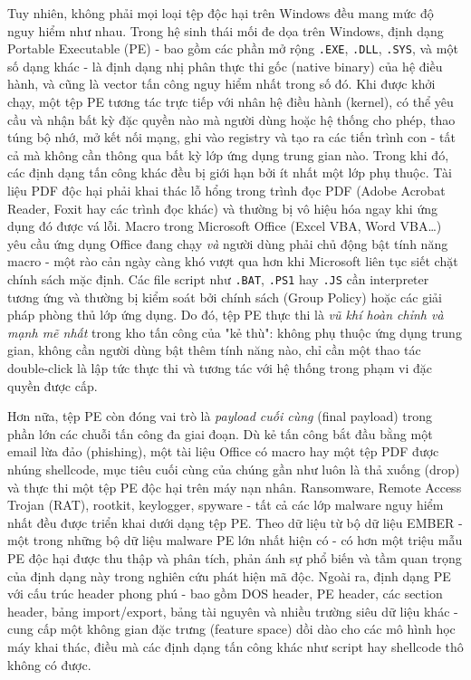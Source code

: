 Tuy nhiên, không phải mọi loại tệp độc hại trên Windows đều mang mức độ
nguy hiểm như nhau. Trong hệ sinh thái mối đe dọa trên Windows, định dạng
Portable Executable (PE) - bao gồm các phần mở rộng \texttt{.EXE},
\texttt{.DLL}, \texttt{.SYS}, và một số dạng khác - là định
dạng nhị phân thực thi gốc (native binary) của hệ điều hành, và cũng là
vector tấn công nguy hiểm nhất trong số đó. Khi được khởi chạy, một tệp PE
tương tác trực tiếp với nhân hệ điều hành (kernel), có thể yêu cầu và nhận
bất kỳ đặc quyền nào mà người dùng hoặc hệ thống cho phép, thao túng bộ nhớ,
mở kết nối mạng, ghi vào registry và tạo ra các tiến trình con - tất cả mà
không cần thông qua bất kỳ lớp ứng dụng trung gian nào. Trong khi đó, các
định dạng tấn công khác đều bị giới hạn bởi ít nhất một lớp
phụ thuộc. Tài liệu PDF độc hại phải khai thác lỗ hổng trong trình đọc PDF
(Adobe Acrobat Reader, Foxit hay các trình đọc khác) và thường bị vô hiệu hóa
ngay khi ứng dụng đó được vá lỗi. Macro trong Microsoft Office (Excel VBA,
Word VBA\ldots) yêu cầu ứng dụng Office đang chạy \textit{và} người dùng phải
chủ động bật tính năng macro - một rào cản ngày càng khó vượt qua hơn khi
Microsoft liên tục siết chặt chính sách mặc định. Các file script như
\texttt{.BAT}, \texttt{.PS1} hay \texttt{.JS} cần interpreter tương ứng và
thường bị kiểm soát bởi chính sách (Group Policy) hoặc các giải pháp phòng thủ lớp ứng dụng.
Do đó, tệp PE thực thi là \textit{vũ khí hoàn chỉnh và mạnh mẽ nhất} trong kho
tấn công của "kẻ thù": không phụ thuộc ứng dụng trung gian, không cần người dùng
bật thêm tính năng nào, chỉ cần một thao tác double-click là lập tức thực thi
và tương tác với hệ thống trong phạm vi đặc quyền được cấp.

Hơn nữa, tệp PE còn đóng vai trò là \textit{payload cuối cùng} (final payload)
trong phần lớn các chuỗi tấn công đa giai đoạn. Dù kẻ tấn công bắt đầu bằng
một email lừa đảo (phishing), một tài liệu Office có macro hay một tệp PDF
được nhúng shellcode, mục tiêu cuối cùng của chúng gần như luôn là thả xuống
(drop) và thực thi một tệp PE độc hại trên máy nạn nhân. Ransomware,
Remote Access Trojan (RAT), rootkit, keylogger, spyware - tất cả các lớp
malware nguy hiểm nhất đều được triển khai dưới dạng tệp PE. Theo dữ liệu
từ bộ dữ liệu EMBER - một trong những bộ dữ liệu malware PE lớn nhất hiện có
- có hơn một triệu mẫu PE độc hại được thu thập và phân tích, \cite{ember2018}
phản ánh sự phổ biến và tầm quan trọng của định dạng này trong nghiên cứu
phát hiện mã độc. Ngoài ra, định dạng PE với cấu trúc header phong phú -
bao gồm DOS header, PE header, các section header, bảng import/export, bảng
tài nguyên và nhiều trường siêu dữ liệu khác - cung cấp một không gian đặc
trưng (feature space) dồi dào cho các mô hình học máy khai thác, điều mà các
định dạng tấn công khác như script hay shellcode thô không có được.

